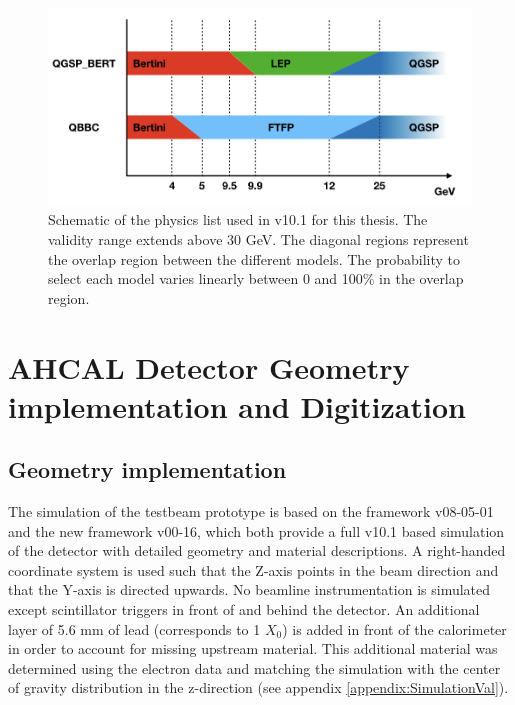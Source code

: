 \begin{figure}[htbp!]
  \centering
  \includegraphics[width=1\linewidth]{chap4/fig/PhysicsLists.jpeg}
  \caption{Schematic of the physics list used in \geant v10.1 for this thesis. The validity range extends above 30 GeV. The diagonal regions represent the overlap region between the different models. The probability to select each model varies linearly between 0 and 100\% in the overlap region.} \label{fig:physics_list}
\end{figure}

\section{AHCAL Detector Geometry implementation and Digitization}

\subsection{Geometry implementation}

The simulation of the testbeam prototype is based on the \mokka framework v08-05-01 and the new \ddhep framework v00-16, which both provide a full \geant v10.1 based simulation of the detector with detailed geometry and material descriptions. A right-handed coordinate system is used such that the Z-axis points in the beam direction and that the Y-axis is directed upwards. No beamline instrumentation is simulated except scintillator triggers in front of and behind the detector. An additional layer of 5.6 mm of lead (corresponds to 1 $X_0$) is added in front of the calorimeter in order to account for missing upstream material. This additional material was determined using the electron data and matching the simulation with the center of gravity distribution in the z-direction (see appendix \ref{appendix:SimulationVal}).

